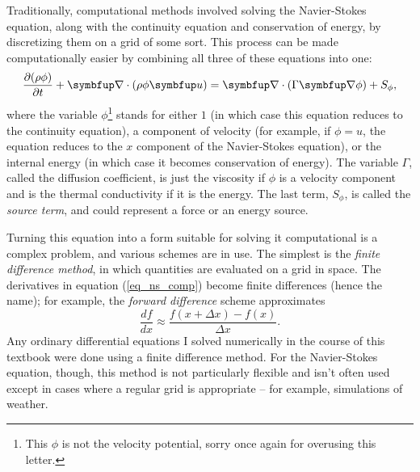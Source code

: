 Traditionally, computational methods involved solving the Navier-Stokes equation, along with the continuity equation and conservation of energy, by discretizing them on a grid of some sort.  This process can be made computationally easier by combining all three of these equations into one:
\begin{equation}
\label{eq_ns_comp}
\dfdx{(\rho \phi)}{t} + \grad \cdot (\rho \phi \vec{u}) = \grad \cdot (\Gamma \grad \phi) + S_\phi,
\end{equation}
where the variable $\phi$\footnote{This $\phi$ is not the velocity potential, sorry once again for overusing this letter.} stands for either $1$ (in which case this equation reduces to the continuity equation), a component of velocity (for example, if $\phi = u$, the equation reduces to the $x$ component of the Navier-Stokes equation), or the internal energy (in which case it becomes conservation of energy).  The variable $\Gamma$, called the diffusion coefficient, is just the viscosity if $\phi$ is a velocity component and is the thermal conductivity if it is the energy.  The last term, $S_\phi$, is called the \emph{source term}, and could represent a force or an energy source.

Turning this equation into a form suitable for solving it computational is a complex problem, and various schemes are in use.  The simplest is the \emph{finite difference method}, in which quantities are evaluated on a grid in space.  The derivatives in equation (\ref{eq_ns_comp}) become finite differences (hence the name); for example, the \emph{forward difference} scheme approximates
\[
\frac{df}{dx} \approx \frac{f(x+\Delta x) - f(x)}{\Delta x}.
\]
Any ordinary differential equations I solved numerically in the course of this textbook were done using a finite difference method.  For the Navier-Stokes equation, though, this method is not particularly flexible and isn't often used except in cases where a regular grid is appropriate -- for example, simulations of weather.


